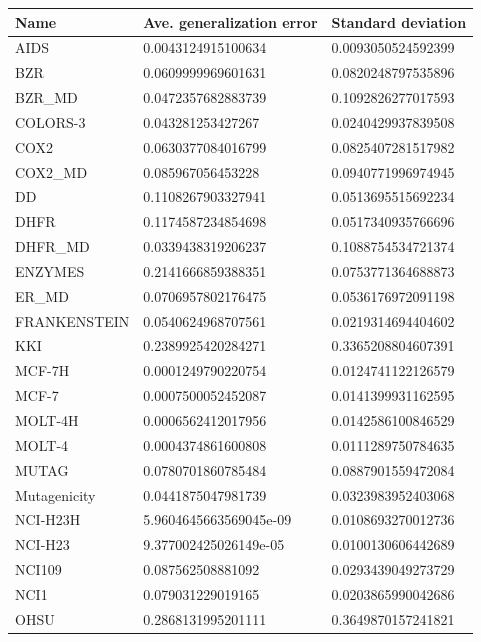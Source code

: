 \begin{table}[!ht]
    \centering
    \footnotesize
    \begin{tabular}{p{3.5cm}|p{5cm}p{5cm}}
    \hline
    \toprule
        Name & Ave. generalization error & Standard deviation \\ 
    \midrule
    AIDS & 0.0043124915100634 & 0.0093050524592399 \\ 
    BZR & 0.0609999969601631 & 0.0820248797535896 \\ 
    BZR\_MD & 0.0472357682883739 & 0.1092826277017593 \\ 
    COLORS-3 & 0.043281253427267 & 0.0240429937839508 \\ 
    COX2 & 0.0630377084016799 & 0.0825407281517982 \\ 
    COX2\_MD & 0.085967056453228 & 0.0940771996974945 \\ 
    DD & 0.1108267903327941 & 0.0513695515692234 \\ 
    DHFR & 0.1174587234854698 & 0.0517340935766696 \\ 
    DHFR\_MD & 0.0339438319206237 & 0.1088754534721374 \\ 
    ENZYMES & 0.2141666859388351 & 0.0753771364688873 \\ 
    ER\_MD & 0.0706957802176475 & 0.0536176972091198 \\ 
    FRANKENSTEIN & 0.0540624968707561 & 0.0219314694404602 \\ 
    KKI & 0.2389925420284271 & 0.3365208804607391 \\ 
    MCF-7H & 0.0001249790220754 & 0.0124741122126579 \\ 
    MCF-7 & 0.0007500052452087 & 0.0141399931162595 \\ 
    MOLT-4H & 0.0006562412017956 & 0.0142586100846529 \\ 
    MOLT-4 & 0.0004374861600808 & 0.0111289750784635 \\ 
    MUTAG & 0.0780701860785484 & 0.0887901559472084 \\ 
    Mutagenicity & 0.0441875047981739 & 0.0323983952403068 \\ 
    NCI-H23H & 5.9604645663569045e-09 & 0.0108693270012736 \\ 
    NCI-H23 & 9.377002425026149e-05 & 0.0100130606442689 \\ 
    NCI109 & 0.087562508881092 & 0.0293439049273729 \\ 
    NCI1 & 0.079031229019165 & 0.0203865990042686 \\ 
    OHSU & 0.2868131995201111 & 0.3649870157241821 \\ 

\end{tabular}
\end{table}
